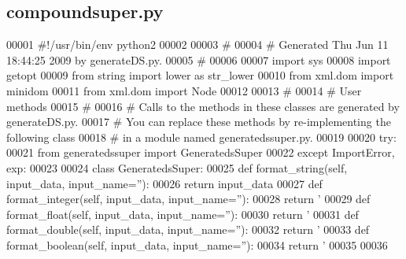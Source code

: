 \subsection{compoundsuper.\+py}
\label{compoundsuper_8py_source}

\begin{DoxyCode}
00001 \textcolor{comment}{#!/usr/bin/env python2}
00002 
00003 \textcolor{comment}{#}
00004 \textcolor{comment}{# Generated Thu Jun 11 18:44:25 2009 by generateDS.py.}
00005 \textcolor{comment}{#}
00006 
00007 \textcolor{keyword}{import} sys
00008 \textcolor{keyword}{import} getopt
00009 \textcolor{keyword}{from} string \textcolor{keyword}{import} lower \textcolor{keyword}{as} str\_lower
00010 \textcolor{keyword}{from} xml.dom \textcolor{keyword}{import} minidom
00011 \textcolor{keyword}{from} xml.dom \textcolor{keyword}{import} Node
00012 
00013 \textcolor{comment}{#}
00014 \textcolor{comment}{# User methods}
00015 \textcolor{comment}{#}
00016 \textcolor{comment}{# Calls to the methods in these classes are generated by generateDS.py.}
00017 \textcolor{comment}{# You can replace these methods by re-implementing the following class}
00018 \textcolor{comment}{#   in a module named generatedssuper.py.}
00019 
00020 \textcolor{keywordflow}{try}:
00021     \textcolor{keyword}{from} generatedssuper \textcolor{keyword}{import} GeneratedsSuper
00022 \textcolor{keywordflow}{except} ImportError, exp:
00023 
00024     \textcolor{keyword}{class }GeneratedsSuper:
00025         \textcolor{keyword}{def }format_string(self, input\_data, input\_name=''):
00026             \textcolor{keywordflow}{return} input\_data
00027         \textcolor{keyword}{def }format_integer(self, input\_data, input\_name=''):
00028             \textcolor{keywordflow}{return} \textcolor{stringliteral}{'%
00029         \textcolor{keyword}{def }format_float(self, input\_data, input\_name=''):
00030             \textcolor{keywordflow}{return} \textcolor{stringliteral}{'%
00031         \textcolor{keyword}{def }format_double(self, input\_data, input\_name=''):
00032             \textcolor{keywordflow}{return} \textcolor{stringliteral}{'%
00033         \textcolor{keyword}{def }format_boolean(self, input\_data, input\_name=''):
00034             \textcolor{keywordflow}{return} \textcolor{stringliteral}{'%
00035 
00036 
}}}}
\end{DoxyCode}
